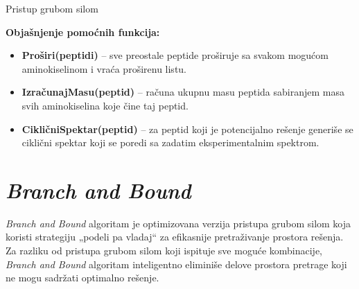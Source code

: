 \documentclass[12pt,oneside]{memoir}
\begin{document}
\begin{algorithm}[H]
\label{alg:brute_force}
\caption{Pristup grubom silom}
\SetAlgoLined
\DontPrintSemicolon
{}
\end{algorithm}

\noindent
\textbf{Objašnjenje pomoćnih funkcija:}
\begin{itemize}
  \item \textbf{Proširi(peptidi)} – sve preostale peptide proširuje sa svakom mogućom aminokiselinom i vraća proširenu listu.
  \item \textbf{IzračunajMasu(peptid)} – računa ukupnu masu peptida sabiranjem masa svih aminokiselina koje čine taj peptid.
  \item \textbf{CikličniSpektar(peptid)} – za peptid koji je potencijalno rešenje generiše se ciklični spektar koji se poredi sa zadatim eksperimentalnim spektrom.
\end{itemize}

\section{\emph{Branch and Bound}}
\emph{Branch and Bound} algoritam \cite{online_lecture, online_book} je optimizovana verzija pristupa grubom silom koja koristi strategiju „podeli pa vladaj“ za efikasnije pretraživanje prostora rešenja. Za razliku od pristupa grubom silom koji ispituje sve moguće kombinacije, \emph{Branch and Bound} algoritam inteligentno eliminiše delove prostora pretrage koji ne mogu sadržati optimalno rešenje.
\end{document}
